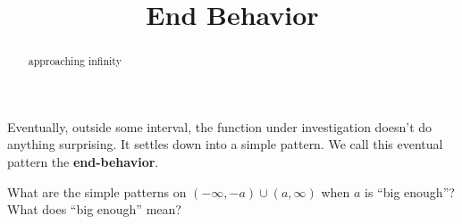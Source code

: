 \documentclass{ximera}
\title{End Behavior}
\begin{document}
\begin{abstract}
approaching infinity
\end{abstract}
\maketitle







Eventually, outside some interval, the function under investigation doesn't do anything surprising.  It settles down into a simple pattern.  We call this eventual pattern the \textbf{\textcolor{purple!85!blue}{end-behavior}}.



What are the simple patterns on $(-\infty, -a) \cup (a, \infty)$ when $a$ is ``big enough''?  What does ``big enough'' mean?
\end{document}
